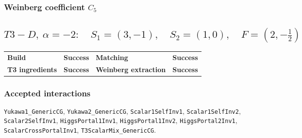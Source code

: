 \documentclass[10pt]{article}
\begin{document}
\subsubsection*{Weinberg coefficient $C_5$}
\noindent{}\par
\smallskip
\clearpage
\subsection*{$T3-D,\ \alpha=-2:\quad S_1=(3,-1),\quad S_2=(1,0),\quad F=(2,-\frac{1}{2})$}
\begin{center}
\begin{tabular}{>{\bfseries}l l >{\bfseries}l l}
\toprule
Build & \textbf{Success} & Matching & \textbf{Success} \\
T3 ingredients & \textbf{Success} & Weinberg extraction & \textbf{Success} \\
\bottomrule
\end{tabular}
\end{center}
\subsubsection*{Accepted interactions}
\texttt{Yukawa1\_GenericCG}, \texttt{Yukawa2\_GenericCG}, \texttt{Scalar1SelfInv1}, \texttt{Scalar1SelfInv2}, \texttt{Scalar2SelfInv1}, \texttt{HiggsPortal1Inv1}, \texttt{HiggsPortal1Inv2}, \texttt{HiggsPortal2Inv1}, \texttt{ScalarCrossPortalInv1}, \texttt{T3ScalarMix\_GenericCG}.
\end{document}
